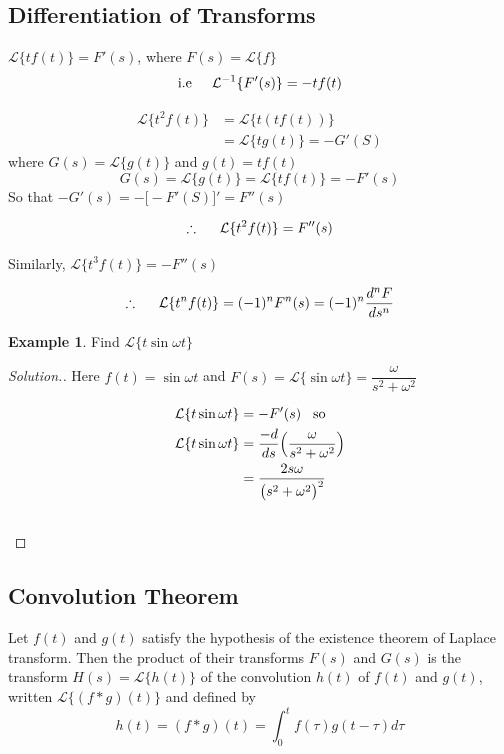 \documentclass[11pt,a4paper]{article}
\theoremstyle{definition}
\newtheorem{exa}[thm]{Example}
\newenvironment{solution}
  {\renewcommand{\qedsymbol}{}\begin{proof}[\textit{Solution}.]}
  {\end{proof}}
\begin{document}
{\color[wave]{485}\subsection{Differentiation of Transforms}}
$\displaystyle{\mathcal{L}\{t f(t)\}=F'(s)}$, where $\displaystyle{F(s) = \mathcal{L}\{f\}}$ $$\text{i.e}\hspace{0.5cm}\mathcal{L}^{-1}\{F'(s)\} = -t f(t)$$

\begin{align*}
\mathcal{L}\{t^2 f(t)\} & = \mathcal{L}\{t(t f(t))\}\\
& = \mathcal{L}\{t g(t)\} = -G'(S)
\end{align*}
where $G(s) = \mathcal{L}\{g(t)\}$ and $g(t) = t f(t)$ 
$$G(s) = \mathcal{L}\{g(t)\} = \mathcal{L}\{t f(t)\} = -F'(s)$$ 
So that $\displaystyle{-G'(s) = -\big[- F'(S)\big]' = F''(s)}$

$$\therefore\hspace{0.5cm} \mathcal{L}\{t^2 f(t)\} = F''(s)$$

Similarly, $\displaystyle{\mathcal{L}\{t^3 f(t)\}} = - F''(s)$

$$\therefore\hspace{0.5cm} \mathcal{L}\{t^n f(t)\} = (-1)^n F^n(s) = (-1)^n \frac{d^n F}{d s^n}$$


\begin{exa}


Find $\displaystyle{\mathcal{L}\{t \sin \omega t\}}$
\end{exa}


\begin{solution}


Here $f(t) = \sin \omega t$ and $\displaystyle{F(s) = \mathcal{L}\{\sin \omega t\}= \dfrac{\omega}{s^2 + \omega^2}}$

\begin{align*}
\mathcal{L}\{t \sin \omega t\} & = - F'(s)\hspace{0.3cm} \text{so}\\
\mathcal{L}\{t \sin \omega t\} & = \frac{-d}{ds}\Big(\frac{\omega}{s^2 + \omega^2}\Big)\\
& = \frac{2s\omega}{\big(s^2 + \omega^2\big)^2}\\\\
\end{align*}
\end{solution}

{\color[wave]{485}\subsection{Convolution Theorem}}
Let $f(t)$ and $g(t)$ satisfy the hypothesis of the existence theorem of Laplace transform. Then the product of their transforms $F(s)$ and $G(s)$ is the transform $H(s) = \mathcal{L}\{h(t)\}$ of the convolution $h(t)$ of $f(t)$ and $g(t)$, written $\mathcal{L}\{(f*g)(t)\}$ and defined by $$h(t) = (f*g)(t) = \int^t_0 f(\tau) g(t-\tau) d \tau$$
\end{document}
